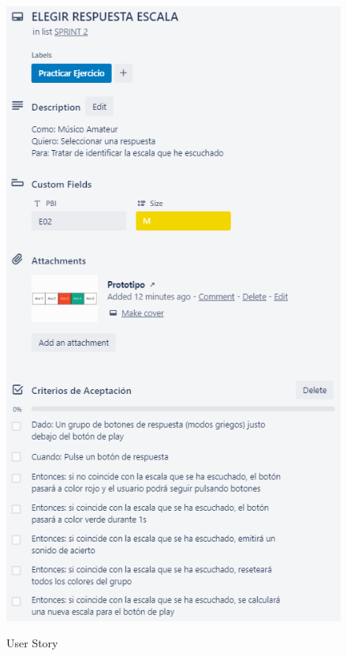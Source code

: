 \documentclass[12pt,twoside,titlepage]{report}
\begin{document}
\begin{figure}[H]
    \centering
    \includegraphics[scale=1.3]{Scrum/User Stories/EscalasRespuestas}
    \label{fig:EscalasRespuestas}
    \caption{User Story}
\end{figure}
\end{document}
